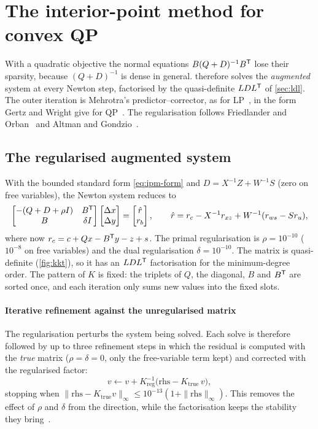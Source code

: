 \section{The interior-point method for convex QP}\label{sec:qp}

With a quadratic objective the normal equations $B(Q+D)^{-1}B^{\mathsf{T}}$ lose their sparsity, because
$(Q+D)^{-1}$ is dense in general.  therefore solves the \emph{augmented} system at
every Newton step, factorised by the quasi-definite $LDL^{\mathsf{T}}$ of \cref{sec:ldl}. The outer iteration
is Mehrotra's predictor--corrector, as for LP~\cite{mehrotra1992,wright1997}, in the form Gertz and
Wright give for QP~\cite{gertz2003}. The regularisation follows Friedlander and
Orban~\cite{friedlander2012} and Altman and Gondzio~\cite{altman1999}.

\subsection{The regularised augmented system}
With the bounded standard form \eqref{eq:ipm-form} and $D = X^{-1}Z + W^{-1}S$ (zero on free
variables), the Newton system reduces to
\begin{equation}\label{eq:aug}
  \begin{bmatrix} -(Q+D+\rho I) & B^{\mathsf{T}}\\ B & \delta I\end{bmatrix}
  \begin{bmatrix}\Delta x\\ \Delta y\end{bmatrix} =
  \begin{bmatrix}\hat r\\ r_b\end{bmatrix},\qquad
  \hat r = r_c - X^{-1}r_{xz} + W^{-1}(r_{ws}-Sr_u),
\end{equation}
where now $r_c = c+Qx-B^{\mathsf{T}} y-z+s$. The primal regularisation is $\rho=10^{-10}$ ($10^{-8}$ on free
variables) and the dual regularisation $\delta=10^{-10}$. The matrix is quasi-definite
(\cref{fig:kkt}), so it has an $LDL^{\mathsf{T}}$ factorisation for the minimum-degree order. The pattern of
$K$ is fixed: the triplets of $Q$, the diagonal, $B$ and $B^{\mathsf{T}}$ are sorted once, and each iteration
only sums new values into the fixed slots.

\paragraph{Iterative refinement against the unregularised matrix}
The regularisation perturbs the system being solved. Each solve is therefore followed by up to three
refinement steps in which the residual is computed with the \emph{true} matrix ($\rho=\delta=0$, only
the free-variable term kept) and corrected with the regularised factor:
\begin{equation}\label{eq:refine}
  v \leftarrow v + K_{\text{reg}}^{-1}\bigl(\text{rhs}-K_{\text{true}}\,v\bigr),
\end{equation}
stopping when $\|\text{rhs}-K_{\text{true}}v\|_\infty\le10^{-13}(1+\|\text{rhs}\|_\infty)$. This removes the
effect of $\rho$ and $\delta$ from the direction, while the factorisation keeps the stability they
bring~\cite{friedlander2012}.

